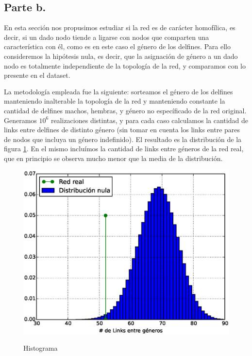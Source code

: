 \subsection{Parte b.}

\par En esta sección nos propusimos estudiar si la red es de carácter homofílica, es decir, si un dado nodo tiende a ligarse con nodos que comparten una característica con él, como es en este caso el género de los delfines. Para ello consideremos la hipótesis nula, es decir, que la asignación de género a un dado nodo es totalmente independiente de la topología de la red, y comparamos con lo presente en el dataset.
\par La metodología empleada fue la siguiente: sorteamos el género de los delfines manteniendo inalterable la topología de la red y manteniendo constante la cantidad de delfines machos, hembras, y género no específicado de la red original. Generamos $10^{6}$ realizaciones distintas, y para cada caso calculamos la cantidad de links entre delfines de distinto género (sin tomar en cuenta los links entre pares de nodos que incluya un género indefinido). El resultado es la distribución de la figura \ref{fig:Histograma}. En el mismo incluímos la cantidad de links entre géneros de la red real, que en principio se observa mucho menor que la media de la distribución.

\begin{figure}[h]
\centering
\includegraphics[scale = 0.50]{figuras/Histograma}
\label{fig:Histograma}
\caption{Histograma}
\end{figure}

